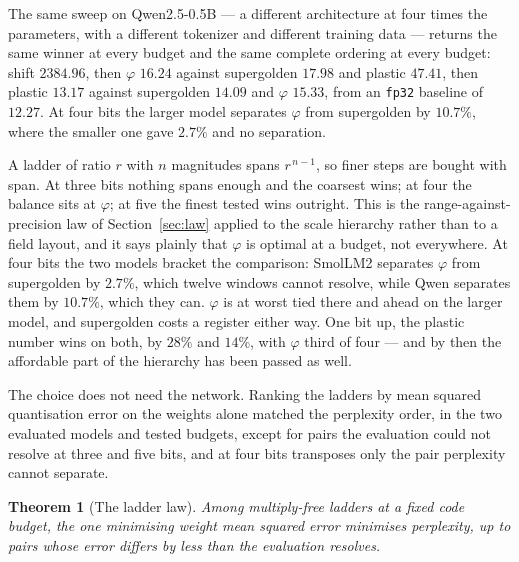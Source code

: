 \documentclass[11pt]{article}
\newtheorem{theorem}{Theorem}
\theoremstyle{definition}
\begin{document}
The same sweep on Qwen2.5-0.5B --- a different architecture at four times the
parameters, with a different tokenizer and different training data --- returns
the same winner at every budget and the same complete ordering at every budget:
shift $2384.96$, then $\varphi$ $\mathbf{16.24}$ against supergolden $17.98$ and
plastic $47.41$, then plastic $\mathbf{13.17}$ against supergolden $14.09$ and
$\varphi$ $15.33$, from an \texttt{fp32} baseline of $12.27$. At four bits the
larger model separates $\varphi$ from supergolden by $10.7\%$, where the smaller
one gave $2.7\%$ and no separation.

A ladder of ratio $r$ with $n$ magnitudes spans $r^{\,n-1}$, so finer steps are
bought with span. At three bits nothing spans enough and the coarsest wins; at
four the balance sits at $\varphi$; at five the finest tested wins outright.
This is the range-against-precision law of Section~\ref{sec:law} applied to the
scale hierarchy rather than to a field layout, and it says plainly that
$\varphi$ is optimal at a budget, not everywhere. At four bits the two models bracket the comparison: SmolLM2 separates
$\varphi$ from supergolden by $2.7\%$, which twelve windows cannot resolve,
while Qwen separates them by $10.7\%$, which they can. $\varphi$ is at worst
tied there and ahead on the larger model, and supergolden costs a register
either way. One bit up, the plastic number wins on both, by $28\%$ and $14\%$,
with $\varphi$ third of four --- and by then the affordable part of the
hierarchy has been passed as well.

The choice does not need the network. Ranking the ladders by mean squared
quantisation error on the weights alone matched the perplexity order, in the two
evaluated models and tested budgets, except for pairs the evaluation could not
resolve
at three and five bits, and at four bits transposes only the pair perplexity
cannot separate.

\begin{theorem}[The ladder law]\label{thm:ladder}
Among multiply-free ladders at a fixed code budget, the one minimising weight
mean squared error minimises perplexity, up to pairs whose error differs by less
than the evaluation resolves.
\end{theorem}
\end{document}
